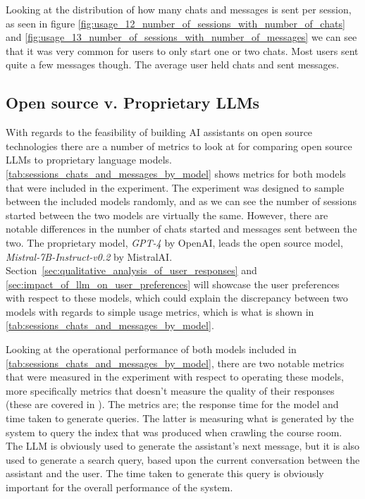 





Looking at the distribution of how many chats and messages is sent per session, as seen in figure \autoref{fig:usage_12_number_of_sessions_with_number_of_chats} and \autoref{fig:usage_13_number_of_sessions_with_number_of_messages} we can see that it was very common for users to only start one or two chats. Most users sent quite a few messages though. The average user held chats and sent messages.








\subsection{Open source v. Proprietary LLMs}


With regards to the feasibility of building AI assistants on open source technologies there are a number of metrics to look at for comparing open source \gls{LLM}s to proprietary language models. \autoref{tab:sessions_chats_and_messages_by_model} shows metrics for both models that were included in the experiment. The experiment was designed to sample between the included models randomly, and as we can see the number of sessions started between the two models are virtually the same. However, there are notable differences in the number of chats started and messages sent between the two. The proprietary model, \textit{GPT-4} by OpenAI, leads the open source model, \textit{Mistral-7B-Instruct-v0.2} by MistralAI. Section~\ref{sec:qualitative_analysis_of_user_responses} and \ref{sec:impact_of_llm_on_user_preferences} will showcase the user preferences with respect to these models, which could explain the discrepancy between two models with regards to simple usage metrics, which is what is shown in \autoref{tab:sessions_chats_and_messages_by_model}.





Looking at the operational performance of both models included in \autoref{tab:sessions_chats_and_messages_by_model}, there are two notable metrics that were measured in the experiment with respect to operating these models, more specifically metrics that doesn’t measure the quality of their responses (these are covered in \label{sec:impact_of_llm_on_user_preferences}). The metrics are; the response time for the model and time taken to generate queries. The latter is measuring what is generated by the system to query the index that was produced when crawling the course room. The \gls{LLM} is obviously used to generate the assistant's next message, but it is also used to generate a search query, based upon the current conversation between the assistant and the user. The time taken to generate this query is obviously important for the overall performance of the system.


